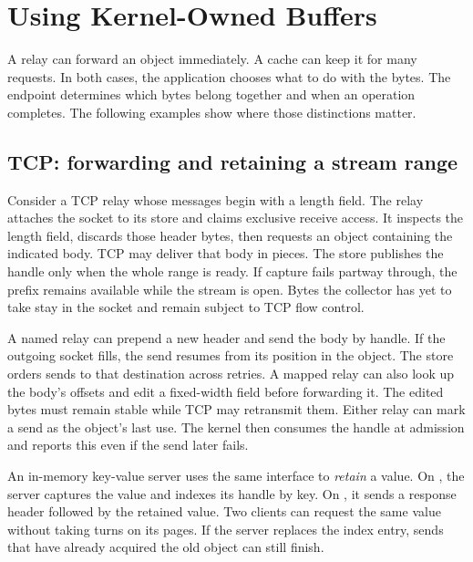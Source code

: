 \section{Using Kernel-Owned Buffers}
\label{sec:apps}

A relay can forward an object immediately. A cache can keep it for many
requests. In both cases, the application chooses what to do with the bytes.
The endpoint determines which bytes belong together and when an operation
completes. The following examples show where those distinctions matter.

\subsection{TCP: forwarding and retaining a stream range}
\label{sec:named:capture}
\label{sec:named:send}

Consider a TCP relay whose messages begin with a length field. The relay attaches
the socket to its store and claims exclusive receive access. It inspects the
length field, discards those header bytes, then requests an object containing
the indicated body. TCP may deliver that body in pieces. The store publishes the
handle only when the whole range is ready. If capture fails partway through,
the prefix remains available while the stream is open. Bytes the collector has
yet to take stay in the socket and remain subject to TCP flow control.

A named relay can prepend a new header and send the body by handle. If the
outgoing socket fills, the send resumes from its position in the object.
The store orders sends to that destination across retries. A mapped relay
can also look up the body's offsets and edit a fixed-width field before
forwarding it. The edited bytes must remain stable while TCP may retransmit
them. Either relay can mark a send as the object's last use. The kernel then
consumes the handle at admission and reports this even if the send later fails.

An in-memory key-value server uses the same interface to \emph{retain} a value.
On , the server captures the value and indexes its handle by key. On
, it sends a response header followed by the retained value. Two clients
can request the same value without taking turns on its pages. If the server
replaces the index entry, sends that have already acquired the old object can
still finish.

